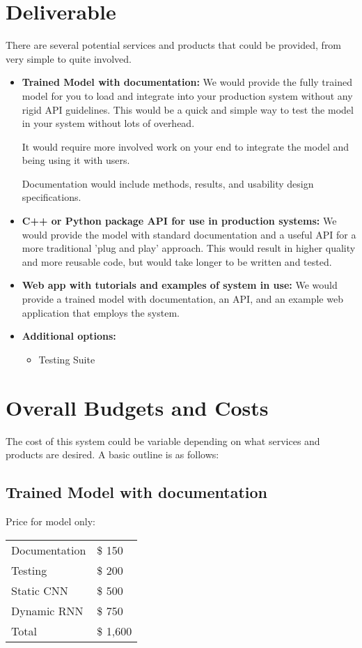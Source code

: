 \documentclass[dvips,12pt]{article}
\begin{document}
\section{Deliverable}
There are several potential services and products that could be provided, from very simple to quite involved. 
\begin{itemize}
\item \textbf{Trained Model with documentation:}
We would provide the fully trained model for you to load and integrate into your production system without any rigid API guidelines. This would be a quick and simple way to test the model in your system without lots of overhead. 

It would require more involved work on your end to integrate the model and being using it with users.

Documentation would include methods, results, and usability design specifications.
\item \textbf{C++ or Python package API for use in production systems:}
We would provide the model with standard documentation and a useful API for a more traditional 'plug and play' approach. This would result in higher quality and more reusable code, but would take longer to be written and tested.

\item \textbf{Web app with tutorials and examples of system in use:}
We would provide a trained model with documentation, an API, and an example web application that employs the system.


\item \textbf{Additional options:}
	\begin{itemize}
	\item Testing Suite
	\end{itemize}
\end{itemize}


\section{Overall Budgets and Costs}
The cost of this system could be variable depending on what services and products are desired. A basic outline is as follows:

\subsection{Trained Model with documentation}
Price for model only:
\begin{center}
\begin{tabular}{ll}
Documentation & \$ 150  \\
Testing       & \$ 200  \\
Static CNN       & \$ 500  \\
Dynamic RNN      & \$ 750  \\
\hline
Total         & \$ 1,600
\end{tabular}
\end{center}
\end{document}
